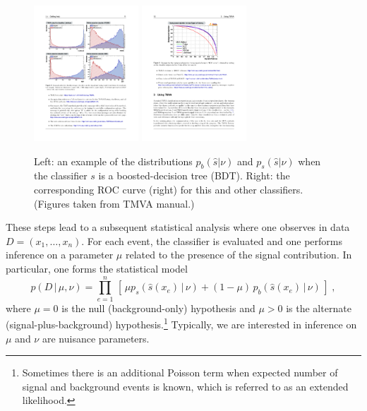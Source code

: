 \documentclass[11pt, oneside]{article}   	%
\begin{document}
\begin{figure}[htbp]
\begin{center}
 \includegraphics[height=2in]{example-TMVA-BDT.pdf}
 \includegraphics[height=2in]{example-TMVA-ROC.pdf}
\caption{Left: an example of the distributions $p_b(\hat s|\nu)$ and $p_s(\hat s|\nu)$ when the classifier $s$ is a boosted-decision tree (BDT). Right: the corresponding ROC curve (right) for this and other classifiers. (Figures taken from TMVA manual.)}
\label{fig:tmva}
\end{center}
\end{figure}

These steps lead to a subsequent statistical analysis where one observes in data \\
${D=(x_1, \dots, x_n)}$. For each event, the classifier is evaluated and one performs inference on a parameter $\mu$ related to the presence of the signal contribution. In particular, one forms the statistical model
\begin{equation}\label{eq:typicalML}
p( D \,|\, \mu, \nu) = \prod_{e=1}^n \, \left[\, \mu p_s( \hat s(x_e) \, |\,  \nu)  + (1-\mu)\, p_b( \hat s(x_e) \,|\, \nu) \,\right] \; ,
\end{equation}
where $\mu=0$ is the null (background-only) hypothesis and $\mu>0$ is the alternate (signal-plus-background) hypothesis.\footnote{Sometimes there is an additional Poisson term when expected number of signal and background events is known, which is referred to as an extended likelihood.} Typically, we are interested in inference on $\mu$ and $\nu$ are nuisance parameters.
\end{document}
